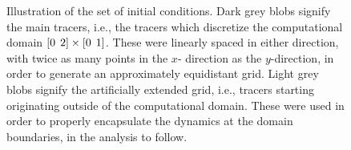 \begin{figure}[htpb]
    \centering
    \resizebox{0.8\linewidth}{!}{}
    \caption[Illustration of the set of initial conditions]
        {Illustration of the set of initial conditions.
                Dark grey blobs signify the main tracers, i.e., the tracers
                which discretize the computational domain
            $[0\hspace{1ex}2]\times[0\hspace{1ex}1]$. These were linearly
        spaced in either direction, with twice as many points in the $x$-
        direction as the $y$-direction, in order to generate an approximately
        equidistant grid. Light grey blobs
        signify the artificially extended grid, i.e., tracers starting
        originating outside of the computational domain. These were used in
        order to properly encapsulate the dynamics at the domain boundaries,
        in the analysis to follow.}
    \label{fig:initialgrid}
\end{figure}
